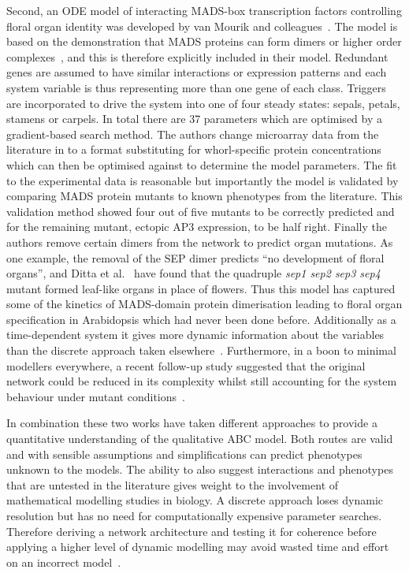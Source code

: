 Second, an ODE model of interacting MADS-box transcription factors controlling floral organ identity was developed by van Mourik and colleagues~\cite{vanmourik2010}.
The model is based on the demonstration that MADS proteins can form dimers or higher order complexes~\cite{honma2001}, and this is therefore explicitly included in their model.
Redundant genes are assumed to have similar interactions or expression patterns and each system variable is thus representing more than one gene of each class.
Triggers are incorporated to drive the system into one of four steady states: sepals, petals, stamens or carpels.
In total there are 37 parameters which are optimised by a gradient-based search method.
The authors change microarray data from the literature in to a format substituting for whorl-specific protein concentrations which can then be optimised against to determine the model parameters.
The fit to the experimental data is reasonable but importantly the model is validated by comparing MADS protein mutants to known phenotypes from the literature.
This validation method showed four out of five mutants to be correctly predicted and for the remaining mutant, ectopic AP3 expression, to be half right.
Finally the authors remove certain dimers from the network to predict organ mutations.
As one example, the removal of the SEP dimer predicts ``no development of floral organs'', and Ditta et al.~\cite{ditta2004} have found that the quadruple \emph{sep1 sep2 sep3 sep4} mutant formed leaf-like organs in place of flowers.
Thus this model has captured some of the kinetics of MADS-domain protein dimerisation leading to floral organ specification in Arabidopsis which had never been done before.
Additionally as a time-dependent system it gives more dynamic information about the variables than the discrete approach taken elsewhere~\cite{espinosa2004}.
Furthermore, in a boon to minimal modellers everywhere, a recent follow-up study suggested that the original network could be reduced in its complexity whilst still accounting for the system behaviour under mutant conditions~\cite{apri2014}.

In combination these two works have taken different approaches to provide a quantitative understanding of the qualitative ABC model.
Both routes are valid and with sensible assumptions and simplifications can predict phenotypes unknown to the models.
The ability to also suggest interactions and phenotypes that are untested in the literature gives weight to the involvement of mathematical modelling studies in biology.
A discrete approach loses dynamic resolution but has no need for computationally expensive parameter searches.
Therefore deriving a network architecture and testing it for coherence before applying a higher level of dynamic modelling may avoid wasted time and effort on an incorrect model~\cite{espinosa2004}.

